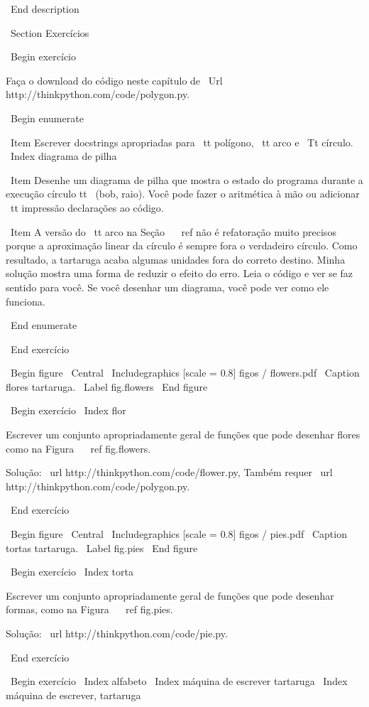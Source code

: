 \documentclass[10pt]{book}
\begin{document}
{\ End {description}


\ Section {Exercícios}

\ Begin {} exercício

Faça o download do código neste capítulo de
\ Url {http://thinkpython.com/code/polygon.py}.

\ Begin {enumerate}

\ Item Escrever docstrings apropriadas para {\ tt polígono}, {\ tt arco} e
{\ Tt círculo}.
\ Index {diagrama de pilha}

\ Item Desenhe um diagrama de pilha que mostra o estado do programa
durante a execução {círculo tt \ (bob, raio)}. Você pode fazer o
aritmética à mão ou adicionar {\ tt impressão} declarações ao código.

\ Item A versão do {\ tt arco} na Seção ~ \ ref {} não é refatoração
muito precisos porque a aproximação linear da
círculo é sempre fora o verdadeiro círculo. Como resultado,
a tartaruga acaba algumas unidades fora do correto
destino. Minha solução mostra uma forma de reduzir
o efeito do erro. Leia o código e ver se faz
sentido para você. Se você desenhar um diagrama, você pode ver como ele funciona.

\ End {enumerate}

\ End {} exercício

\ Begin {figure}
\ Central
{\ Includegraphics [scale = 0.8] {figos / flowers.pdf}}
\ Caption {flores tartaruga.}
\ Label {} fig.flowers
\ End {figure}

\ Begin {} exercício
\ Index {flor}

Escrever um conjunto apropriadamente geral de funções que
pode desenhar flores como na Figura ~ \ ref {} fig.flowers.

Solução: \ url {http://thinkpython.com/code/flower.py},
Também requer \ url {http://thinkpython.com/code/polygon.py}.

\ End {} exercício

\ Begin {figure}
\ Central
{\ Includegraphics [scale = 0.8] {figos / pies.pdf}}
\ Caption {tortas tartaruga.}
\ Label {} fig.pies
\ End {figure}


\ Begin {} exercício
\ Index {torta}

Escrever um conjunto apropriadamente geral de funções que
pode desenhar formas, como na Figura ~ \ ref {} fig.pies.

Solução: \ url {http://thinkpython.com/code/pie.py}.

\ End {} exercício

\ Begin {} exercício
\ Index {alfabeto}
\ Index {máquina de escrever tartaruga}
\ Index {máquina de escrever, tartaruga}

}
\end{document}
